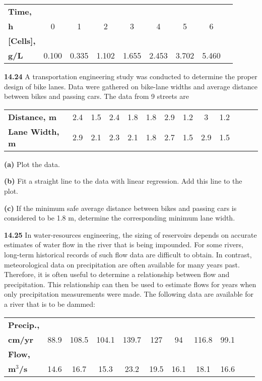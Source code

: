 \documentclass[../main.tex]{subfiles}
\begin{document}
\begin{multicols}{2}
	\noindent \begin{tabular}{l c c c c c c c c}
		\textbf{Time,} \\
		\textbf{h} &  0 &  1 &  2 &  3 &  4 &  5 &  6 \\
		\textbf{[Cells],} \\
		\textbf{g/L} & 0.100 & 0.335 & 1.102 & 1.655 & 2.453 & 3.702 & 5.460
	\end{tabular}

	\noindent\textbf{14.24} A transportation engineering study was conducted to
	determine the proper design of bike lanes. Data were gathered on bike-lane widths and average distance between bikes
	and passing cars. The data from 9 streets are

	\noindent \begin{tabular}{l c c c c c c c c c c c c}
		\textbf{Distance, m} & 2.4 & 1.5 & 2.4 & 1.8 & 1.8 & 2.9 & 1.2 & 3 & 1.2 \\
		\textbf{Lane Width, m} & 2.9 & 2.1 & 2.3 & 2.1 & 1.8 & 2.7 & 1.5 & 2.9 & 1.5
	\end{tabular}

	\noindent \textbf{(a)} Plot the data.

	\noindent \textbf{(b)} Fit a straight line to the data with linear regression. Add this line to the plot.

	\noindent \textbf{(c)} If the minimum safe average distance between bikes and passing cars is considered to be 1.8 m, determine the corresponding minimum lane width.

	\noindent\textbf{14.25}  In water-resources engineering, the sizing of reservoirs depends on accurate estimates of water flow in the
	river that is being impounded. For some rivers, long-term
	historical records of such flow data are difficult to obtain. In
	contrast, meteorological data on precipitation are often
	available for many years past. Therefore, it is often useful to determine a relationship between flow and precipitation.
	This relationship can then be used to estimate flows for
	years when only precipitation measurements were made.
	The following data are available for a river that is to be
	dammed:

	\noindent \begin{tabular}{l c c c c c c c c c c}
		\textbf{Precip.,} \\
		\textbf{cm/yr} & 88.9 & 108.5 & 104.1 & 139.7 & 127 & 94 & 116.8 & 99.1 \\
		\textbf{Flow,} \\
		\textbf{m$^3$/s} & 14.6 & 16.7 & 15.3 & 23.2 & 19.5 & 16.1 & 18.1 & 16.6
	\end{tabular}	


\end{multicols}
\end{document}
